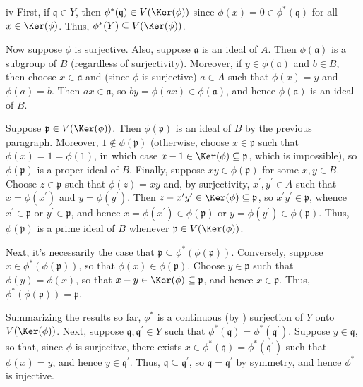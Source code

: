 \begin{partsolution}{iv}
First, if \(\mathfrak{q} \in Y\), then \(\phi^*(\mathfrak{q}) \in V(\Ker(\phi))\) since \(\phi(x) = 0 \in \phi^*(\mathfrak{q})\) for all \(x \in \Ker(\phi)\).
Thus, \(\phi^*(Y) \subseteq V(\Ker(\phi))\).

Now suppose \(\phi\) is surjective.
Also, suppose \(\mathfrak{a}\) is an ideal of \(A\).
Then \(\phi(\mathfrak{a})\) is a subgroup of \(B\) (regardless of surjectivity).
Moreover, if \(y \in \phi(\mathfrak{a})\) and \(b \in B\), then choose \(x \in \mathfrak{a}\) and (since \(\phi\) is surjective) \(a \in A\) such that \(\phi(x) = y\) and \(\phi(a) = b\).
Then \(a x \in \mathfrak{a}\), so \(b y = \phi(a x) \in \phi(\mathfrak{a})\), and hence \(\phi(\mathfrak{a})\) is an ideal of \(B\).

Suppose \(\mathfrak{p} \in V(\Ker(\phi))\).
Then \(\phi(\mathfrak{p})\) is an ideal of \(B\) by the previous paragraph.
Moreover, \(1 \notin \phi(\mathfrak{p})\) (otherwise, choose \(x \in \mathfrak{p}\) such that \(\phi(x) = 1 = \phi(1)\), in which case \(x - 1 \in \Ker(\phi) \subseteq \mathfrak{p}\), which is impossible), so \(\phi(\mathfrak{p})\) is a proper ideal of \(B\).
Finally, suppose \(x y \in \phi(\mathfrak{p})\) for some \(x, y \in B\).
Choose \(z \in \mathfrak{p}\) such that \(\phi(z) = x y\) and, by surjectivity, \(x^\prime, y^\prime \in A\) such that \(x = \phi(x^\prime)\) and \(y = \phi(y^\prime)\).
Then \(z - x^\prime y^\prime \in \Ker(\phi) \subseteq \mathfrak{p}\), so \(x^\prime y^\prime \in \mathfrak{p}\), whence \(x^\prime \in \mathfrak{p}\) or \(y^\prime \in \mathfrak{p}\), and hence \(x = \phi(x^\prime) \in \phi(\mathfrak{p})\) or \(y = \phi(y^\prime) \in \phi(\mathfrak{p})\).
Thus, \(\phi(\mathfrak{p})\) is a prime ideal of \(B\) whenever \(\mathfrak{p} \in V(\Ker(\phi))\).

Next, it's necessarily the case that \(\mathfrak{p} \subseteq \phi^*(\phi(\mathfrak{p}))\).
Conversely, suppose \(x \in \phi^*(\phi(\mathfrak{p}))\), so that \(\phi(x) \in \phi(\mathfrak{p})\).
Choose \(y \in \mathfrak{p}\) such that \(\phi(y) = \phi(x)\), so that \(x - y \in \Ker(\phi) \subseteq \mathfrak{p}\), and hence \(x \in \mathfrak{p}\).
Thus, \(\phi^*(\phi(\mathfrak{p})) = \mathfrak{p}\).

Summarizing the results so far, \(\phi^*\) is a continuous (by ) surjection of \(Y\) onto \(V(\Ker(\phi))\).
Next, suppose \(\mathfrak{q}, \mathfrak{q}^\prime \in Y\) such that \(\phi^*(\mathfrak{q}) = \phi^*(\mathfrak{q}^\prime)\).
Suppose \(y \in \mathfrak{q}\), so that, since \(\phi\) is surjecitve, there exists \(x \in \phi^*(\mathfrak{q}) = \phi^*(\mathfrak{q}^\prime)\) such that \(\phi(x) = y\), and hence \(y \in \mathfrak{q}^\prime\).
Thus, \(\mathfrak{q} \subseteq \mathfrak{q}^\prime\), so \(\mathfrak{q} = \mathfrak{q}^\prime\) by symmetry, and hence \(\phi^*\) is injective.


\end{partsolution}
